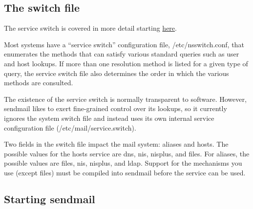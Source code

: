 
\protect\hypertarget{part0026_split_025.html}{}{}

\hypertarget{part0026_split_025.htmlux5cux23_idContainer1247}{}
\hypertarget{part0026_split_025.htmlux5cux23calibre_pb_24}{%
\subsection[The switch
file]{\texorpdfstring{\protect\hypertarget{part0026_split_025.htmlux5cux23_idTextAnchor1046}{}{}The
switch
file}{The switch file}}\label{part0026_split_025.htmlux5cux23calibre_pb_24}}

\leavevmode\hypertarget{part0026_split_025.htmlux5cux23_idContainer1122}{}%
The service switch is covered in more detail starting
\protect\hyperlink{part0025_split_012.htmlux5cux23_idTextAnchor990}{here}.

\protect\hypertarget{part0026_split_025.htmlux5cux23_idIndexMarker2497}{}{}Most
systems have a ``service switch'' configuration file,
\protect\hypertarget{part0026_split_025.htmlux5cux23_idIndexMarker2498}{}{}{/etc/nsswitch.conf},
that enumerates the methods that can satisfy various standard queries
such as user and host lookups. If more than one resolution method is
listed for a given type of query, the service switch file also
determines the order in which the various methods are consulted.

The existence of the service switch is normally transparent to software.
However, {sendmail} likes to exert fine-grained control over its
lookups, so it currently ignores the system switch file and instead uses
its own internal service configuration file
({/etc/mail/service.switch}).

Two fields in the switch file impact the mail system: {aliases} and
{hosts}. The possible values for the hosts service are {dns}, {nis},
{nisplus}, and {files}. For aliases, the possible values are {files},
{nis}, {nisplus}, and {ldap}. Support for the mechanisms you use (except
{files}) must be compiled into {sendmail} before the service can be
used.

\protect\hypertarget{part0026_split_026.html}{}{}

\hypertarget{part0026_split_026.htmlux5cux23_idContainer1247}{}
\hypertarget{part0026_split_026.htmlux5cux23calibre_pb_25}{%
\subsection[Starting
{sendmail}]{\texorpdfstring{\protect\hypertarget{part0026_split_026.htmlux5cux23_idTextAnchor1047}{}{}Starting
{sendmail}}{Starting sendmail}}\label{part0026_split_026.htmlux5cux23calibre_pb_25}}

